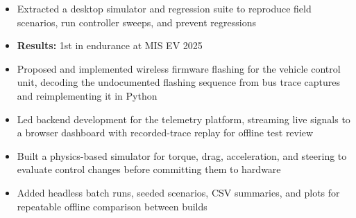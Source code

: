 \documentclass[10pt,letterpaper]{article}
\begin{document}
\entryspace

\orgline{\spartanracing}
\begin{itemize}
  \item Extracted a desktop simulator and regression suite to reproduce field scenarios, run controller sweeps, and prevent regressions
  \item \textbf{Results:} 1st in endurance at MIS EV 2025
\end{itemize}


\begin{itemize}
  \item Proposed and implemented wireless firmware flashing for the vehicle control unit, decoding the undocumented flashing sequence from bus trace captures and reimplementing it in Python
  \item Led backend development for the telemetry platform, streaming live signals to a browser dashboard with recorded-trace replay for offline test review
\end{itemize}

\entryspace

\orgline{\spartanracing}
\begin{itemize}
  \item Built a physics-based simulator for torque, drag, acceleration, and steering to evaluate control changes before committing them to hardware
  \item Added headless batch runs, seeded scenarios, CSV summaries, and plots for repeatable offline comparison between builds
\end{itemize}
\end{document}
